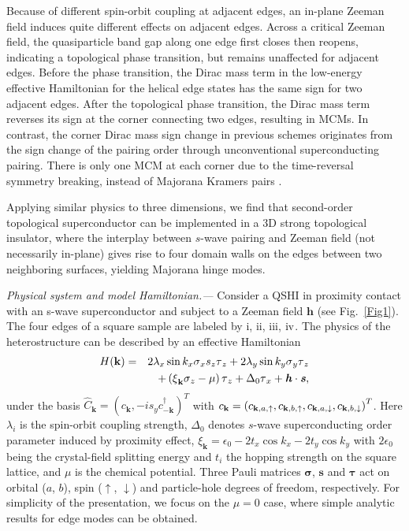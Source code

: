\documentclass[twocolumn,prl,floatfix,citeautoscript,nofootinbib,superscriptaddress]{revtex4}
\begin{document}
Because of different spin-orbit coupling at adjacent edges, an in-plane
Zeeman field induces quite different effects on adjacent edges. Across a
critical Zeeman field, the quasiparticle band gap along one edge first
closes then reopens, indicating a topological phase transition, but remains
unaffected for adjacent edges. Before the phase transition, the Dirac mass
term in the low-energy effective Hamiltonian for the helical edge states has
the same sign for two adjacent edges. After the topological phase
transition, the Dirac mass term reverses its sign at the corner connecting
two edges, resulting in MCMs. In contrast, the corner Dirac mass sign change
in previous schemes originates from the sign change of the pairing order
through unconventional superconducting pairing. There is only one MCM at
each corner due to the time-reversal symmetry breaking, instead of Majorana
Kramers pairs \cite{Yan2018, Wang2018}.

Applying similar physics to three dimensions, we find that second-order
topological superconductor can be implemented in a 3D strong topological
insulator, where the interplay between $s$-wave pairing and Zeeman field
(not necessarily in-plane) gives rise to four domain walls on the edges
between two neighboring surfaces, yielding Majorana hinge modes.

{\color{blue}\emph{Physical system and model Hamiltonian.---}} Consider a
QSHI in proximity contact with an s-wave superconductor and subject to a
Zeeman field $\bm{h}$ (see Fig.~\ref{Fig1}). The four edges of a square
sample are labeled by $\mathrm{i}$, $\mathrm{ii}$, $\mathrm{iii}$, $\mathrm{%
iv}$. The physics of the heterostructure can be described by an effective
Hamiltonian \cite{Yan2018}%
\begin{eqnarray}
H(\mathbf{k}) &=&2\lambda _{x}\sin k_{x}\sigma _{x}s_{z}\tau _{z}+2\lambda
_{y}\sin k_{y}\sigma _{y}\tau _{z}  \notag \\
&&+\left( \xi _{\mathbf{k}}\sigma _{z}-\mu \right) \tau _{z}+\Delta _{0}\tau
_{x}+\bm{\mathit{h}}\cdot \bm{\mathit{s}},  \label{Ham}
\end{eqnarray}%
under the basis $\hat{C}_{\mathbf{k}}=\left( c_{\mathbf{k}},-is_{y}c_{-%
\mathbf{k}}^{\dagger }\right) ^{T}$ with $c_{\mathbf{k}}=\left( c_{\mathbf{k}%
,a,\uparrow },c_{\mathbf{k},b,\uparrow },c_{\mathbf{k},a,\downarrow },c_{%
\mathbf{k},b,\downarrow }\right) ^{T}$. Here $\lambda _{i}$ is the
spin-orbit coupling strength, $\Delta _{0}$ denotes $s$-wave superconducting
order parameter induced by proximity effect, $\xi _{\mathbf{k}}=\epsilon
_{0}-2t_{x}\cos k_{x}-2t_{y}\cos k_{y}$ with $2\epsilon _{0}$ being the
crystal-field splitting energy and $t_{i}$ the hopping strength on the
square lattice, and $\mu $ is the chemical potential. Three Pauli matrices $%
\bm{\sigma}$, $\bm{s}$ and $\bm{\tau}$ act on orbital ($a$, $b$), spin ($%
\uparrow $, $\downarrow $) and particle-hole degrees of freedom,
respectively. For simplicity of the presentation, we focus on the $\mu =0$
case, where simple analytic results for edge modes can be obtained.
\end{document}
